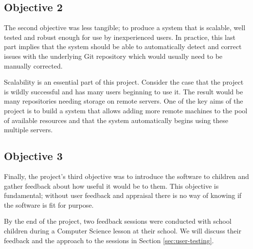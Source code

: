 \subsection{Objective 2} 

The second objective was less tangible; to produce a system that is scalable, well tested and robust enough for use by inexperienced users. In practice, this last part implies that the system should be able to automatically detect and correct issues with the underlying Git repository which would usually need to be manually corrected.

Scalability is an essential part of this project. Consider the case that the project is wildly successful and has many users beginning to use it. The result would be many repositories needing storage on remote servers. One of the key aims of the project is to build a system that allows adding more remote machines to the pool of available resources and that the system automatically begins using these multiple servers.

\subsection{Objective 3}

Finally,  the project's third objective was to introduce the software to children and gather feedback about how useful it would be to them. This objective is fundamental; without user feedback and appraisal there is no way of knowing if the software is fit for purpose.

By the end of the project, two feedback sessions were conducted with school children during a Computer Science lesson at their school. We will discuss their feedback and the approach to the sessions in Section \ref{sec:user-testing}.
